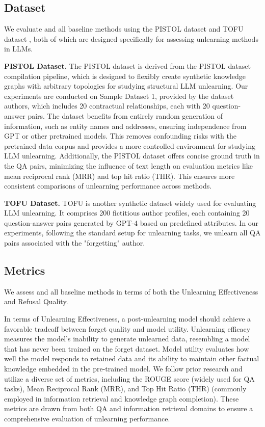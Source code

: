 \subsection{Dataset}\label{app:dataset}
We evaluate \lunar and all baseline methods using the PISTOL dataset \citep{qiu2024pistol} and TOFU dataset \citep{tofu}, both of which are designed specifically for assessing unlearning methods in LLMs.

\textbf{PISTOL Dataset.} The PISTOL dataset is derived from the PISTOL dataset compilation pipeline, which is designed to flexibly create synthetic knowledge graphs with arbitrary topologies for studying structural LLM unlearning. Our experiments are conducted on Sample Dataset 1, provided by the dataset authors, which includes 20 contractual relationships, each with 20 question-answer pairs. The dataset benefits from entirely random generation of information, such as entity names and addresses, ensuring independence from GPT or other pretrained models. This removes confounding risks with the pretrained data corpus and provides a more controlled environment for studying LLM unlearning. Additionally, the PISTOL dataset offers concise ground truth in the QA pairs, minimizing the influence of text length on evaluation metrics like mean reciprocal rank (MRR) and top hit ratio (THR). This ensures more consistent comparisons of unlearning performance across methods.

\textbf{TOFU Dataset.} TOFU is another synthetic dataset widely used for evaluating LLM unlearning. It comprises 200 fictitious author profiles, each containing 20 question-answer pairs generated by GPT-4 based on predefined attributes. In our experiments, following the standard setup for unlearning tasks, we unlearn all QA pairs associated with the "forgetting" author.


\subsection{Metrics}\label{app:metrics}
We assess \lunar and all baseline methods in terms of both the Unlearning Effectiveness and Refusal Quality.

In terms of Unlearning Effectiveness, a post-unlearning model should achieve a favorable tradeoff between forget quality and model utility. Unlearning efficacy measures the model's inability to generate unlearned data, resembling a model that has never been trained on the forget dataset. Model utility evaluates how well the model responds to retained data and its ability to maintain other factual knowledge embedded in the pre-trained model. We follow prior research \cite{qiu2024pistol} and utilize a diverse set of metrics, including the ROUGE score (widely used for QA tasks), Mean Reciprocal Rank (MRR), and Top Hit Ratio (THR) (commonly employed in information retrieval and knowledge graph completion). These metrics are drawn from both QA and information retrieval domains to ensure a comprehensive evaluation of unlearning performance.

